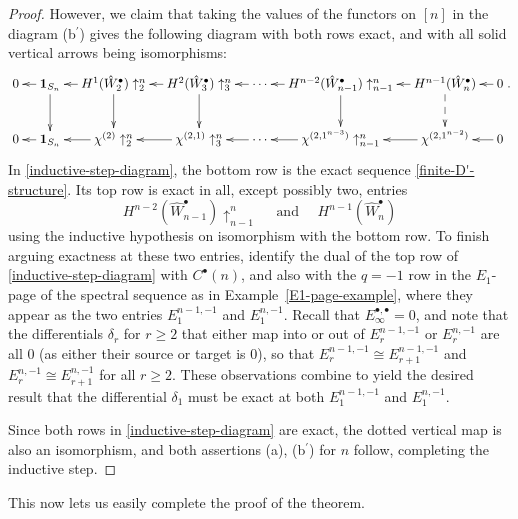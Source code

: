 \documentclass[12pt]{amsart}
\theoremstyle{plain}
\theoremstyle{definition}
\begin{document}
\begin{proof}
However, we claim that taking the values of the functors on $[n]$ in
the diagram (b${}^\prime$) gives
the following diagram with both rows exact, and with all solid vertical
arrows being isomorphisms:
\begin{equation}
\label{inductive-step-diagram}
\xymatrix@C=10pt{
0 &{{\mathbf{1}}}_{S_n} \ar[l] \ar[d] &H^1(\hat{W}_2^\bullet)\uparrow_{2}^{n} \ar[l] \ar[d] & H^2(\hat{W}_3^\bullet)\uparrow_{3}^{n} \ar[l] \ar[d] & 
  \cdots \ar[l]  & H^{n-2}(\hat{W}_{n-1}^\bullet)\uparrow_{n-1}^{n} \ar[l] \ar[d] & H^{n-1}(\hat{W}_n^\bullet) \ar[l] \ar@{-->}[d] &0 \ar[l]\\
0 &{{\mathbf{1}}}_{S_n} \ar[l]&\chi^{(2)}\uparrow_{2}^{n} \ar[l]& \chi^{(2,1)}\uparrow_{3}^{n} \ar[l]& 
  \cdots \ar[l] & \chi^{(2,1^{n-3})}\uparrow_{n-1}^{n} \ar[l] & \chi^{(2,1^{n-2})} \ar[l] &0 \ar[l]\\
}.
\end{equation}
In \eqref{inductive-step-diagram}, the bottom row is the 
exact sequence \eqref{finite-D'-structure}.  Its top row
is exact in all, except possibly two, entries 
\begin{equation*}
H^{n-2}(\hat{W}_{n-1}^\bullet)\uparrow_{n-1}^{n}
\quad \text{ and }\quad
H^{n-1}(\hat{W}_n^\bullet)
\end{equation*}
using the inductive hypothesis on isomorphism with the bottom row.  
To finish arguing exactness at these
two entries, identify the dual of the top row of 
\eqref{inductive-step-diagram} with $C^\bullet(n)$,
and also with the $q=-1$ row in the $E_1$-page of the spectral sequence as in Example~\ref{E1-page-example}, where
they appear as the two entries $E_1^{n-1,-1}$ and $E_1^{n,-1}$.
Recall that $E^{\bullet,\bullet}_\infty=0$, and note that 
the differentials $\delta_r$ for
$r \geq 2$ that either map into or out of $E_r^{n-1,-1}$ or $E_r^{n,-1}$ are all 
$0$ (as either their source or target is $0$),  so that
$E_r^{n-1,-1} \cong E_{r+1}^{n-1,-1}$ and $E_r^{n,-1}\cong E_{r+1}^{n,-1}$ for all $r\ge 2$.   These observations  combine to  yield the desired result that  the differential
$\delta_1$  must be exact at both $E_1^{n-1,-1}$ and $E_1^{n,-1}$.

Since both rows in \eqref{inductive-step-diagram} are exact,
the dotted vertical map
is also an isomorphism, and both
assertions (a), (b${}^\prime$) for $n$ follow, completing the
inductive step.
\end{proof}

This now lets us easily complete the proof of the theorem.
\end{document}
